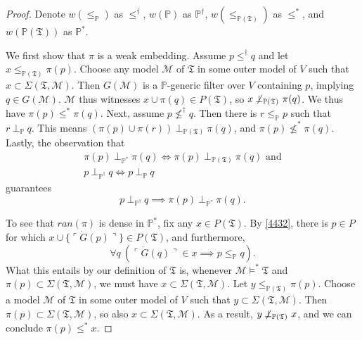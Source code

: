 \documentclass[12pt]{article}
\numberwithin{equation}{section}
\begin{document}
\begin{proof}
Denote $w(\leq_{\mathbb{P}})$ as $\leq^{\dagger}$, $w(\mathbb{P})$ as $\mathbb{P}^{\dagger}$, $w(\leq_{\mathbb{P}(\mathfrak{T})})$ as $\leq^*$, and $w(\mathbb{P}(\mathfrak{T}))$ as $\mathbb{P}^*$. 

We first show that $\pi$ is a weak embedding. Assume $p \leq^{\dagger} q$ and let $x \leq_{\mathbb{P}(\mathfrak{T})} \pi(p)$. Choose any model $\mathcal{M}$ of $\mathfrak{T}$ in some outer model of $V$ such that $x \subset \Sigma(\mathfrak{T}, \mathcal{M})$. Then $G(\mathcal{M})$ is a $\mathbb{P}$-generic filter over $V$ containing $p$, implying $q \in G(\mathcal{M})$. $\mathcal{M}$ thus witnesses $x \cup \pi(q) \in P(\mathfrak{T})$, so $x \not \! \! \bot_{\mathbb{P}(\mathfrak{T})} \ \pi(q)$. We thus have $\pi(p) \leq^* \pi(q)$. Next, assume $p \not \leq^{\dagger} q$. Then there is $r \leq_{\mathbb{P}} p$ such that $r \ \bot_{\mathbb{P}} \ q$. This means $(\pi(p) \cup \pi(r)) \ \bot_{\mathbb{P}(\mathfrak{T})} \ \pi(q)$, and $\pi(p) \not \leq^* \pi(q)$. Lastly, the observation that
\begin{gather*}
    \pi(p) \ \bot_{\mathbb{P}^*} \ \pi(q) \iff \pi(p) \ \bot_{\mathbb{P}(\mathfrak{T})} \ \pi(q) \text{ and} \\
    p \ \bot_{\mathbb{P}^{\dagger}} \ q \iff p \ \bot_{\mathbb{P}} \ q
\end{gather*}
guarantees $$p \ \bot_{\mathbb{P}^{\dagger}} \ q \implies  \pi(p) \ \bot_{\mathbb{P}^*} \ \pi(q) \text{.}$$

To see that $ran(\pi)$ is dense in $\mathbb{P}^*$, fix any $x \in P(\mathfrak{T})$. By \ref{4432}, there is $p \in P$ for which $x \cup \{\ulcorner \dot{G}(p) \urcorner\} \in P(\mathfrak{T})$, and furthermore, $$\forall q \ (\ulcorner \dot{G}(q) \urcorner \in x \implies p \leq_{\mathbb{P}} q) \text{.}$$ What this entails by our definition of $\mathfrak{T}$ is, whenever $\mathcal{M} \models^* \mathfrak{T}$ and $\pi(p) \subset \Sigma(\mathfrak{T}, \mathcal{M})$, we must have $x \subset \Sigma(\mathfrak{T}, \mathcal{M})$. Let $y \leq_{\mathbb{P}(\mathfrak{T})} \pi(p)$. Choose a model $\mathcal{M}$ of $\mathfrak{T}$ in some outer model of $V$ such that $y \subset \Sigma(\mathfrak{T}, \mathcal{M})$. Then $\pi(p) \subset \Sigma(\mathfrak{T}, \mathcal{M})$, so also $x \subset \Sigma(\mathfrak{T}, \mathcal{M})$. As a result, $y \not \! \! \bot_{\mathbb{P}(\mathfrak{T})} \ x$, and we can conclude $\pi(p) \leq^* x$.
\end{proof}
\end{document}
